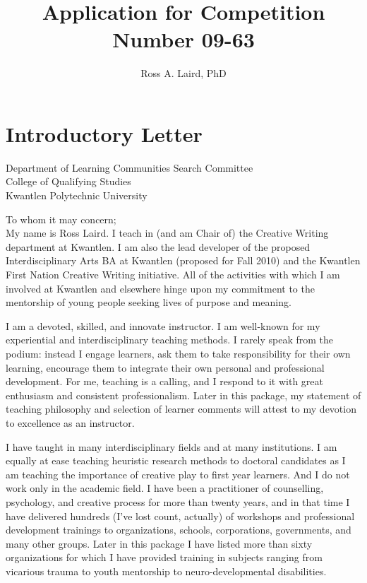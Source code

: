 \documentclass[10pt,DIV09,letterpaper,oneside,headsepline]{scrreprt}
\date{}
\title{\Large{Application for Competition Number 09-63\\}\vspace{.10in}}
\author{\large{Ross A. Laird, PhD}}
\begin{document}
\begin{center}
\maketitle
\end{center}
\tableofcontents
\chapter{Introductory Letter}

Department of Learning Communities Search Committee\\
College of Qualifying Studies\\
Kwantlen Polytechnic University\\

\bigskip

To whom it may concern;\\


My name is Ross Laird. I teach in (and am Chair of) the Creative Writing department at Kwantlen. I am also the lead developer of the proposed Interdisciplinary Arts BA at Kwantlen (proposed for Fall 2010) and the Kwantlen First Nation Creative Writing initiative. All of the activities with which I am involved at Kwantlen and elsewhere hinge upon my commitment to the mentorship of young people seeking lives of purpose and meaning.

I am a devoted, skilled, and innovate instructor. I am well-known for my experiential and interdisciplinary teaching methods. I rarely speak from the podium: instead I engage learners, ask them to take responsibility for their own learning, encourage them to integrate their own personal and professional development. For me, teaching is a calling, and I respond to it with great enthusiasm and consistent professionalism. Later in this package, my statement of teaching philosophy and selection of learner comments will attest to my devotion to excellence as an instructor.

I have taught in many interdisciplinary fields and at many institutions. I am equally at ease teaching heuristic research methods to doctoral candidates as I am teaching the importance of creative play to first year learners. And I do not work only in the academic field. I have been a practitioner of counselling, psychology, and creative process for more than twenty years, and in that time I have delivered hundreds (I've lost count, actually) of workshops and professional development trainings to organizations, schools, corporations, governments, and many other groups. Later in this package I have listed more than sixty organizations for which I have provided training in subjects ranging from vicarious trauma to youth mentorship to neuro-developmental disabilities.
\end{document}
